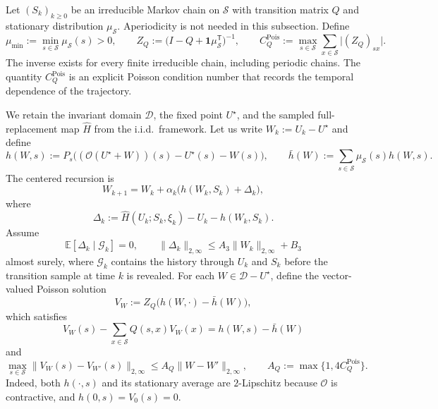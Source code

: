 \documentclass{article}
\newcommand{\X}{\mathcal{S}}
\begin{document}
Let $(S_k)_{k\ge0}$ be an irreducible Markov chain on $\X$ with transition matrix $Q$ and stationary distribution $\mu_{\X}$. Aperiodicity is not needed in this subsection. Define
\begin{equation}
\mu_{\min}:=\min_{s\in\X}\mu_{\X}(s)>0,\qquad
Z_Q:=\bigl(I-Q+\bm 1\mu_{\X}^{\mathsf T}\bigr)^{-1},\qquad
C_Q^{\mathrm{Pois}}:=\max_{s\in\X}\sum_{x\in\X}\lvert (Z_Q)_{sx}\rvert.
\end{equation}
The inverse exists for every finite irreducible chain, including periodic chains. The quantity $C_Q^{\mathrm{Pois}}$ is an explicit Poisson condition number that records the temporal dependence of the trajectory.

We retain the invariant domain $\mathcal D$, the fixed point $U^\star$, and the sampled full-replacement map $\widehat H$ from the i.i.d.\ framework. Let us write $W_k:=U_k-U^\star$ and define
\begin{equation}
h(W,s):=P_s\bigl((\mathcal O(U^\star+W))(s)-U^\star(s)-W(s)\bigr),\qquad
\bar h(W):=\sum_{s\in\X}\mu_{\X}(s)h(W,s).
\end{equation}
The centered recursion is
\begin{equation}
W_{k+1}=W_k+\alpha_k\bigl(h(W_k,S_k)+\Delta_k\bigr),
\end{equation}
where
\begin{equation}
\Delta_k:=\widehat H(U_k;S_k,\xi_k)-U_k-h(W_k,S_k).
\end{equation}
Assume
\begin{equation}
\mathbb E[\Delta_k\mid\mathcal G_k]=0,\qquad
\lVert\Delta_k\rVert_{2,\infty}\le A_3\lVert W_k\rVert_{2,\infty}+B_3
\end{equation}
almost surely, where $\mathcal G_k$ contains the history through $U_k$ and $S_k$ before the transition sample at time $k$ is revealed. For each $W\in\mathcal D-U^\star$, define the vector-valued Poisson solution
\begin{equation}
V_W:=Z_Q\bigl(h(W,\cdot)-\bar h(W)\bigr),
\end{equation}
which satisfies
\begin{equation}
V_W(s)-\sum_{x\in\X}Q(s,x)V_W(x)=h(W,s)-\bar h(W)
\end{equation}
and
\begin{equation}
\max_{s\in\X}\lVert V_W(s)-V_{W'}(s)\rVert_{2,\infty}\le A_Q\lVert W-W'\rVert_{2,\infty},\qquad
A_Q:=\max\{1,4C_Q^{\mathrm{Pois}}\}.
\end{equation}
Indeed, both $h(\cdot,s)$ and its stationary average are $2$-Lipschitz because $\mathcal O$ is contractive, and $h(0,s)=V_0(s)=0$.
\end{document}
